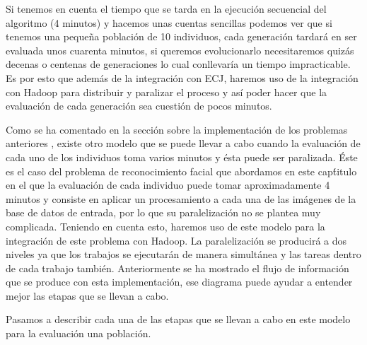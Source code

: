 Si tenemos en cuenta el tiempo que se tarda en la ejecución secuencial del algoritmo (4 minutos) y hacemos unas cuentas sencillas podemos ver que si tenemos una peque\~na población de 10 individuos, cada generación tardar\'a en ser evaluada unos cuarenta minutos, si queremos evolucionarlo necesitaremos quizás decenas o centenas de generaciones lo cual conllevar\'ia un tiempo impracticable. Es por esto que adem\'as de la integración con ECJ, haremos uso de la integración con Hadoop para distribuir y paralizar el proceso y así poder hacer que la evaluación de cada generación sea cuestión de pocos minutos.

Como se ha comentado en la sección sobre la implementación de los problemas anteriores , existe otro modelo que se puede llevar a cabo cuando la evaluación de cada uno de los individuos toma varios minutos y \'esta puede ser paralizada. \'Este es el caso del problema de reconocimiento facial que abordamos en este cap\'titulo en el que la evaluación de cada individuo puede tomar aproximadamente 4 minutos y consiste en aplicar un procesamiento a cada una de las imágenes de la base de datos de entrada, por lo que su paralelizaci\'on no se plantea muy complicada. Teniendo en cuenta esto, haremos uso de este modelo para la integraci\'on de este problema con Hadoop. La paralelizaci\'on se producirá a dos niveles ya que los trabajos se ejecutar\'an de manera simultánea y las tareas dentro de cada trabajo también. Anteriormente  se ha mostrado el flujo de información que se produce con esta implementación, ese diagrama puede ayudar a entender mejor las etapas que se llevan a cabo. 

Pasamos a describir cada una de las etapas que se llevan a cabo en este modelo para la evaluaci\'on una poblaci\'on.

